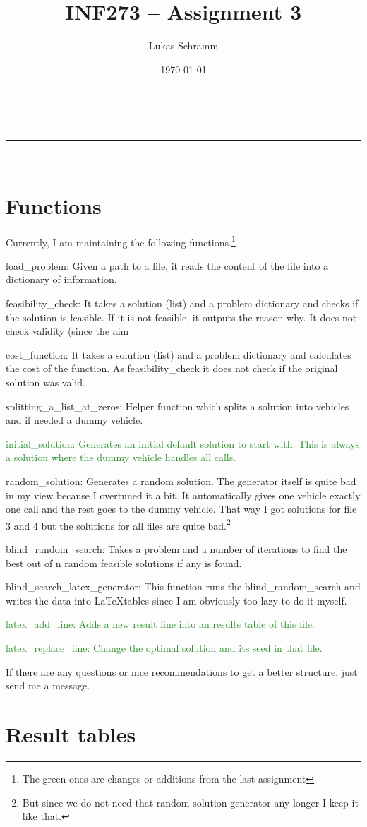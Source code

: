 \documentclass[a4paper,11pt]{article}
\makeatletter
\newcommand{\linia}{\rule{\linewidth}{0.5pt}}
\theoremstyle{mytheor}
\renewcommand{\maketitle}{
\begin{center}
\vspace{2ex}
{\huge \textsc{\@title}}
\vspace{1ex}
\\
\linia\\
\@author \hfill \@date
\vspace{4ex}
\end{center}
}
\makeatother
\begin{document}
\title{INF273 – Assignment 3}

\author{Lukas Schramm}

\date{\today}

\maketitle

\section{Functions}
Currently, I am maintaining the following functions.\footnote{The green ones are changes or additions from the last assignment}
\begin{itemize}
\item load\_problem: Given a path to a file, it reads the content of the file into a dictionary of information.
\item feasibility\_check: It takes a solution (list) and a problem dictionary and checks if the solution is feasible. If it is not feasible, it outputs the reason why. It does not check validity (since the aim
\item cost\_function: It takes a solution (list) and a problem dictionary and calculates the cost of the function. As feasibility\_check it does not check if the original solution was valid.
\item splitting\_a\_list\_at\_zeros: Helper function which splits a solution into vehicles and if needed a dummy vehicle.
\textcolor{ForestGreen}{\item initial\_solution: Generates an initial default solution to start with. This is always a solution where the dummy vehicle handles all calls.}
\item random\_solution: Generates a random solution. The generator itself is quite bad in my view because I overtuned it a bit. It automatically gives one vehicle exactly one call and the rest goes to the dummy vehicle. That way I got solutions for file 3 and 4 but the solutions for all files are quite bad.\footnote{But since we do not need that random solution generator any longer I keep it like that.}
\item blind\_random\_search: Takes a problem and a number of iterations to find the best out of n random feasible solutions if any is found.
\item blind\_search\_latex\_generator: This function runs the blind\_random\_search and writes the data into \LaTeX tables since I am obviously too lazy to do it myself.
\item \textcolor{ForestGreen}{latex\_add\_line: Adds a new result line into an results table of this file.}
\item \textcolor{ForestGreen}{latex\_replace\_line: Change the optimal solution and its seed in that file.}

If there are any questions or nice recommendations to get a better structure, just send me a message.
\end{itemize}

\clearpage

\section{Result tables}

\end{document}
